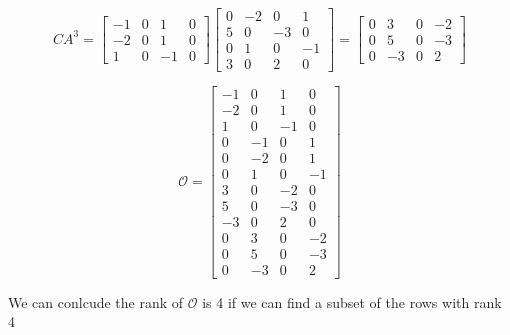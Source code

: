 \documentclass{article}
\begin{document}
\begin{enumerate}[label=\alph*)]
\begin{enumerate}[label=\roman*)]
    \[
    CA^3 = 
    \begin{bmatrix}
        -1 & 0 & 1 & 0 \\
        -2 & 0 & 1 & 0 \\
        1 & 0 & -1 & 0
    \end{bmatrix} 
    \begin{bmatrix}
        0 & -2 & 0 & 1 \\
        5 & 0 & -3 & 0 \\
        0 & 1 & 0 & -1 \\
        3 & 0 & 2 & 0
    \end{bmatrix}
    =
    \begin{bmatrix}
        0 & 3 & 0 & -2 \\
        0 & 5 & 0 & -3 \\
        0 & -3 & 0 & 2
    \end{bmatrix}
    \]

    \[
    \mathcal{O} =
    \begin{bmatrix}
        -1 & 0 & 1 & 0 \\
        -2 & 0 & 1 & 0 \\
        1 & 0 & -1 & 0 \\
        0 & -1 & 0 & 1 \\
        0 & -2 & 0 & 1 \\
        0 & 1 & 0 & -1 \\
        3 & 0 & -2 & 0 \\
        5 & 0 & -3 & 0 \\
        -3 & 0 & 2 & 0 \\
        0 & 3 & 0 & -2 \\
        0 & 5 & 0 & -3 \\
        0 & -3 & 0 & 2
    \end{bmatrix}
    \]

    We can conlcude the rank of $\mathcal{O}$ is 4 if we can find a subset of the rows with rank 4


\end{enumerate}
\end{enumerate}
\end{document}
